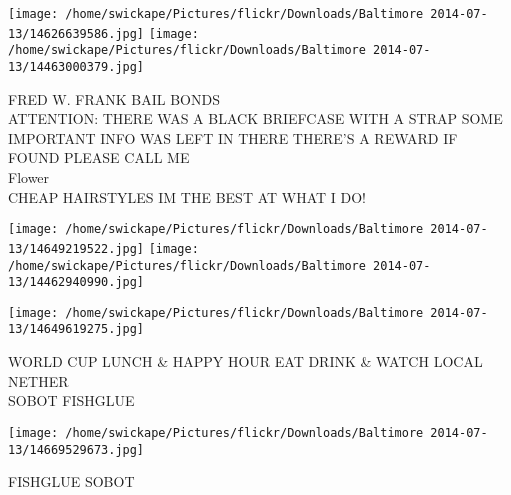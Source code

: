 \documentclass[10pt,letterpaper]{article}
\begin{document}
\texttt{[image: /home/swickape/Pictures/flickr/Downloads/Baltimore 2014-07-13/14626639586.jpg]}
\texttt{[image: /home/swickape/Pictures/flickr/Downloads/Baltimore 2014-07-13/14463000379.jpg]}

FRED W. FRANK BAIL BONDS\\
ATTENTION: THERE WAS A BLACK BRIEFCASE WITH A STRAP SOME IMPORTANT INFO WAS LEFT IN THERE THERE'S A REWARD IF FOUND PLEASE CALL ME\\
Flower\\
CHEAP HAIRSTYLES IM THE BEST AT WHAT I DO!
\pagebreak

\texttt{[image: /home/swickape/Pictures/flickr/Downloads/Baltimore 2014-07-13/14649219522.jpg]}
\texttt{[image: /home/swickape/Pictures/flickr/Downloads/Baltimore 2014-07-13/14462940990.jpg]}

\texttt{[image: /home/swickape/Pictures/flickr/Downloads/Baltimore 2014-07-13/14649619275.jpg]}

WORLD CUP LUNCH \& HAPPY HOUR EAT DRINK \& WATCH LOCAL\\
NETHER\\
SOBOT FISHGLUE
\pagebreak

\texttt{[image: /home/swickape/Pictures/flickr/Downloads/Baltimore 2014-07-13/14669529673.jpg]}

FISHGLUE SOBOT
\pagebreak
\end{document}
